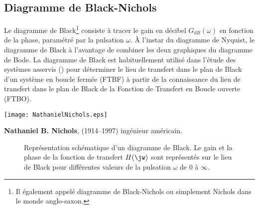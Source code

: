 \subsection{Diagramme de Black-Nichols}
Le diagramme de Black\footnote{Il également appelé diagramme 
de Black-Nichols ou simplement Nichols dans le monde anglo-saxon.} 
consiste à tracer le gain en décibel $G_{dB}(\omega)$ en fonction de 
la phase, paramétré par la pulsation $\omega$. À l'instar du diagramme de 
Nyquist, le diagramme de Black à l'avantage de combiner les deux graphiques 
du diagramme de Bode. La diagramme de Black est habituellement utilisé dans 
l'étude des systèmes asservis () pour déterminer le lieu 
de transfert dans le plan de Black d'un système en boucle fermée (FTBF) à 
partir de la connaissance du lieu de transfert dans le plan de Black de la 
Fonction de Transfert en Boucle ouverte (FTBO).
\begin{marginfigure}
    \centering
    \texttt{[image: NathanielNichols.eps]} 
    \caption*{\textbf{Nathaniel B. Nichols}, 
              (1914–1997) ingénieur américain.}
\end{marginfigure}
\begin{figure}[!h]
    \centering
    
    \caption{Représentation schématique d'un diagramme de Black. Le gain et 
             la phase de la fonction de transfert $H(\jw)$ sont représentés sur
             le lieu de Black pour différentes valeurs de la pulsation $\omega$
             de 0 à $\infty$.\label{fig-sche_black}}
\end{figure}
\newpage
\restoregeometry
\captionsetup{width=0.9\linewidth}
